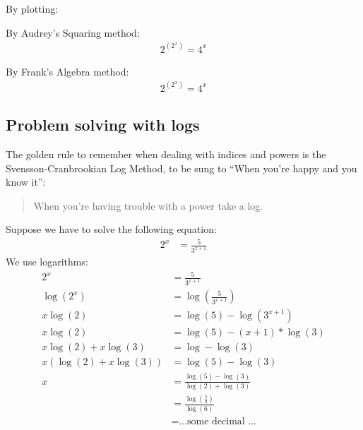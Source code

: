 By plotting:
\begin{figure}[!hbt]
\label{fig:SolvingLogEqnsEx0}
\end{figure}

By Audrey's Squaring method:
\begin{align}
  2^{(2^x)} = 4^x
\end{align}

By Frank's Algebra method:
\begin{align}
  2^{(2^x)} = 4^x
\end{align}

\subsection{Problem solving with logs}
The golden rule to remember when dealing with indices and powers is the
Svensson-Cranbrookian Log Method, to be sung to ``When you're happy and you know
it'':
\begin{quote}
  When you're having trouble with a power take a log.
\end{quote}

Suppose we have to solve the following equation:
\begin{align}
  2^{x} & = \frac{5}{3^{x+1}}
\end{align}
We use logarithms:
\begin{align}
  2^{x} & = \frac{5}{3^{x+1}} \\
  \log(2^x) & = \log(\frac{5}{3^{x+1}}) \\
  x \log(2) & = \log(5) - \log(3^{x+1}) \\
  x \log(2) & = \log(5) - (x+1) * \log(3) \\
  x \log(2) + x \log(3)  & = \log - \log(3) \\
  x(\log(2) + x \log(3)) & = \log(5) - \log(3) \\
  x & = \frac{\log(5) - \log(3)}{\log(2) + \log(3)} \\
    & = \frac{\log(\frac{5}{3})}{\log(6)} \\
    & = \text{\ldots some decimal \ldots }
\end{align}

